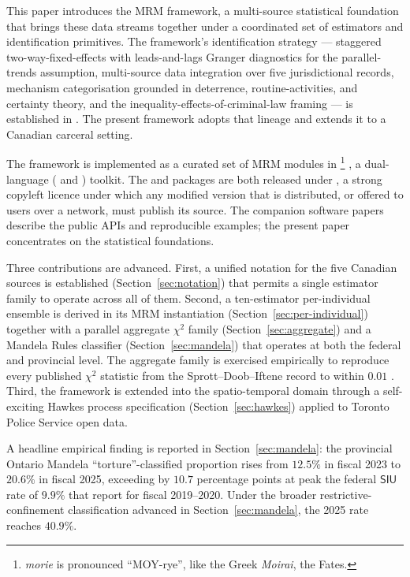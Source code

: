 \documentclass[article,shortnames,nojss]{jss}
\newcommand{\SIU}{\textsf{SIU}}
\begin{document}
This paper introduces the MRM framework,
a multi-source statistical foundation that brings these data streams
together under a coordinated set of estimators and identification
primitives. The framework's identification strategy --- staggered
two-way-fixed-effects with leads-and-lags Granger diagnostics for the
parallel-trends assumption, multi-source data integration over five
jurisdictional records, mechanism categorisation grounded in
deterrence, routine-activities, and certainty theory, and the
inequality-effects-of-criminal-law framing --- is established in
\citet{ZorroMedina2023JMP}. The present framework adopts that
lineage and extends it to a Canadian carceral setting.

The framework is implemented as a curated set of MRM modules in
\footnote{\textit{morie} is pronounced ``MOY-rye'',
like the Greek \textit{Moirai}, the Fates.}
\citep{Ruhela2026MorieR, Ruhela2026MoriePy}, a dual-language
( and ) toolkit.  The 
and  packages are both released under
, a strong copyleft licence under which
any modified version that is distributed, or offered to users
over a network, must publish its source.  The
companion software papers describe the public
APIs and reproducible examples; the present paper concentrates on
the statistical foundations.

Three contributions are advanced. First, a unified notation for the
five Canadian sources is established
(Section~\ref{sec:notation}) that permits a single estimator family
to operate across all of them. Second, a ten-estimator
per-individual ensemble is derived in its MRM instantiation
(Section~\ref{sec:per-individual}) together with a parallel
aggregate $\chi^{2}$ family (Section~\ref{sec:aggregate}) and a
Mandela Rules classifier (Section~\ref{sec:mandela}) that operates
at both the federal and provincial level. The aggregate family is
exercised empirically to reproduce every published $\chi^{2}$
statistic from the Sprott--Doob--Iftene record to within $0.01$
\citep{SprottDoob2021, SprottDoobIftene2021}. Third, the framework is
extended into the spatio-temporal domain through a self-exciting
Hawkes process specification (Section~\ref{sec:hawkes}) applied to
Toronto Police Service open data.

A headline empirical finding is reported in
Section~\ref{sec:mandela}: the provincial Ontario Mandela
``torture''-classified proportion rises from $12.5\%$ in fiscal
2023 to $20.6\%$ in fiscal 2025, exceeding by $10.7$ percentage
points at peak the federal $\SIU$ rate of $9.9\%$ that
\citet{SprottDoob2021} report for fiscal 2019--2020. Under the
broader restrictive-confinement classification advanced in
Section~\ref{sec:mandela}, the 2025 rate reaches $40.9\%$.
\end{document}
